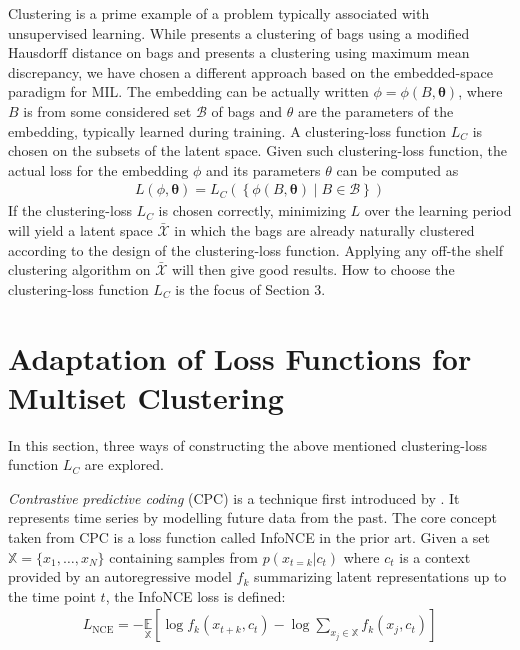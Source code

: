 \documentclass[a4paper]{llncs}
\begin{document}
Clustering is a prime example of a problem typically associated with unsupervised learning. While \cite{wang_solving_2000} presents a clustering of bags using a modified Hausdorff distance on bags and \cite{kohout_network_2018} presents a clustering using maximum mean discrepancy, we have chosen a different approach based on the embedded-space paradigm for MIL. The embedding can be actually written $\phi = \phi( B, \mathbf{\theta})$, where $B$ is from some considered set $\mathcal{B}$ of bags and $\theta$ are the parameters of the embedding, typically learned during training.	A clustering-loss function $L_C$ is chosen on the subsets of the latent space. Given such clustering-loss function, the actual loss for the embedding $\phi$ and its parameters $\theta$ can be computed as
\begin{gather}
	L \left( \phi, \mathbf{\theta} \right) = L_C \left( \left\{ \phi \left( B, \mathbf{\theta} \right) \middle| B \in \mathcal{B} \right\} \right)
\end{gather}
If the clustering-loss	$L_C$ is chosen correctly, minimizing  $L$ over the learning period will yield a latent space $\bar{\mathcal{X}}$ in which the bags are already naturally clustered according to the design of the clustering-loss function. Applying any off-the shelf clustering algorithm on  $\bar{\mathcal{X}}$ will then give good results. How to choose the clustering-loss function $L_C$ is the focus of Section 3.

\section{Adaptation of Loss Functions for Multiset Clustering}

In this section, three ways of constructing the above mentioned clustering-loss function $L_C$ are explored.

\emph{Contrastive predictive coding} (CPC) is a technique first introduced by \cite{oord_representation_2019}. It represents time series by modelling future data from the past. The core concept taken from CPC is a loss function called InfoNCE in the prior art. Given a set $\mathbb{X} = \{x_1,\dots,x_N\}$ containing samples from $p (x_{t=k}|c_t)$ where $c_t$ is a context provided by an autoregressive model $f_k$ summarizing latent representations up to the time point $t$, the InfoNCE loss is defined:
\begin{gather}
	L_\text{NCE} = - \underset{\mathbb{X}}{\mathbb{E}} \left[\log f_k \left( x_{t + k}, c_t \right) - \log \sum_{x_j \in \mathbb{X}} f_k \left( x_j, c_t \right) \right]
\end{gather}
\end{document}
